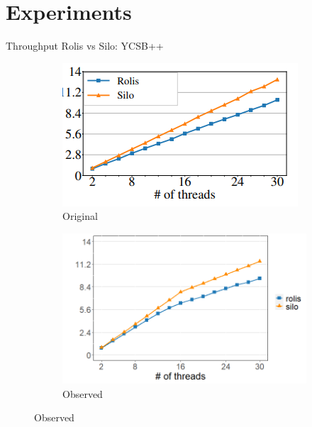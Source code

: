 \documentclass[notes, xcolor=dvipsnames]{beamer}
\begin{document}
   
    \section{Experiments}

    \begin{frame}{Throughput Rolis vs Silo: YCSB++}
        
        \begin{figure}
            \begin{subfigure}[h]{0.5\textwidth}
                \includegraphics[scale=0.65]{rolis_fig10_ycsb.png}
                \caption{Original}
            \end{subfigure}%
            \hfill
            \begin{subfigure}[h]{0.5\textwidth}
                \includegraphics[scale=0.30]{fig10_ycsb.png}
                \caption{Observed}
            \end{subfigure}
        \end{figure}

    \end{frame}
\end{document}
